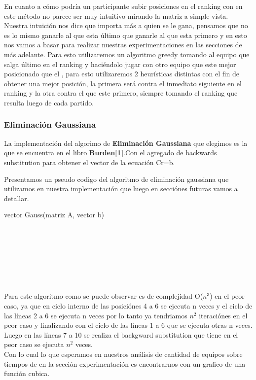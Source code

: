 En cuanto a cómo podría un participante subir posiciones en el ranking con en este método no parece ser muy intuitivo mirando la matriz a simple vista. Nuestra intuición nos dice que importa más a quien se le gana, pensamos que no es lo mismo ganarle al que esta último que ganarle al que esta primero
y en esto nos vamos a basar para realizar nuestras experimentaciones en las secciones de más adelante.
Para esto utilizaremos un algoritmo greedy tomando al equipo que salga último en el ranking y haciéndolo jugar con otro equipo que este mejor posicionado que el , para esto utilizaremos 2 heurísticas distintas
con el fin de obtener una mejor posición, la primera será contra el inmediato siguiente en el ranking y la otra contra el que este primero, siempre tomando el ranking que resulta luego de cada partido.

\subsubsection{Eliminación Gaussiana}
La implementación del algorimo de \textbf{Eliminación Gaussiana} que elegimos es la que se encuentra en el libro \textbf{Burden[1]}.Con el agregado de backwards substitution para 
obtener el vector de la ecuaci\'on Cr=b.

Presentamos un pseudo codigo del algoritmo de eliminaci\'on gaussiana que utilizamos en nuestra implementaci\'on que luego en secci\'ones futuras vamos a detallar.

\begin{algorithm}
    \begin{algorithmic}[1]\parskip=2mm
        \caption{vector Gauss(matriz A, vector b)}
        \\
        \\
        \\
        \\
        \\
        \\
    \end{algorithmic}
\end{algorithm}


Para este algoritmo como se puede observar es de complejidad O($n^3$) en el peor caso, ya que en ciclo interno de las posici\'ones 4 a 6 se ejecuta n veces
y el ciclo de las l\'ineas 2 a 6 se ejecuta n veces por lo tanto ya tendriamos $n^2$ iteraci\'ones en el peor caso y finalizando con el ciclo de las l\'ineas 1 a 6 que se ejecuta otras n veces.
Luego en las l\'ineas 7 a 10 se realiza el backgward substitution  que tiene en el peor caso se ejecuta $n^2$ veces.\\
Con lo cual lo que esperamos en nuestros an\'alisis de cantidad de equipos sobre tiempos de en la secci\'on experimentaci\'on es encontrarnos con un grafico de una funci\'on cubica.


